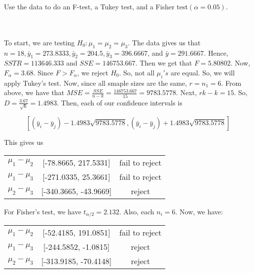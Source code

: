 Use the data to do an F-test, a Tukey test, and a Fisher test$(\alpha=0.05)$.\\\\

\begin{solution}\renewcommand{\qedsymbol}{}\ \\
    To start, we are testing $H_0:\mu_1=\mu_2=\mu_3$. The data gives us that
    $n=18, \bar{y}_1=273.8333, \bar{y}_2=204.5, \bar{y}_3=396.6667$, and $\bar{y}=291.6667$. Hence,
    $SSTR=113646.333$ and $SSE=146753.667$. Then we get that $F=5.80802$. Now, $F_{\alpha}=3.68$. Since
    $F>F_{\alpha}$, we reject $H_0$. So, not all $\mu_i's$ are equal. So, we will apply Tukey's test.
    Now, since all smaple sizes are the same, $r=n_1=6$. From above, we have that
    $MSE=\frac{SSE}{n-k}=\frac{146753.667}{15}=9783.5778$. Next, $rk-k=15$. So,
    $D=\frac{3.67}{\sqrt{6}}=1.4983$. Then, each of our confidence intervals is

    $$[(\bar{y}_i-\bar{y}_j)-1.4983\sqrt{9783.5778}, (\bar{y}_i-\bar{y}_j)+1.4983\sqrt{9783.5778}]$$
    
    This gives us
    
    \begin{center}
        \begin{tabular}{ c   c   c  }
            $\mu_1-\mu_2$ & [-78.8665, 217.5331] & fail to reject\\
            $\mu_1-\mu_3$ & [-271.0335, 25.3661] & fail to reject\\
            $\mu_2-\mu_3$ & [-340.3665, -43.9669] & reject
        \end{tabular}
    \end{center}
    For Fisher's test, we have $t_{\alpha/2}=2.132$. Also, each $n_i=6$. Now, we have: 
    \begin{center}
        \begin{tabular}{ c   c   c  }
            $\mu_1-\mu_2$ & [-52.4185, 191.0851] & fail to reject\\
            $\mu_1-\mu_3$ & [-244.5852, -1.0815] & reject\\
            $\mu_2-\mu_3$ & [-313.9185, -70.4148] & reject
        \end{tabular}
    \end{center}

\end{solution}